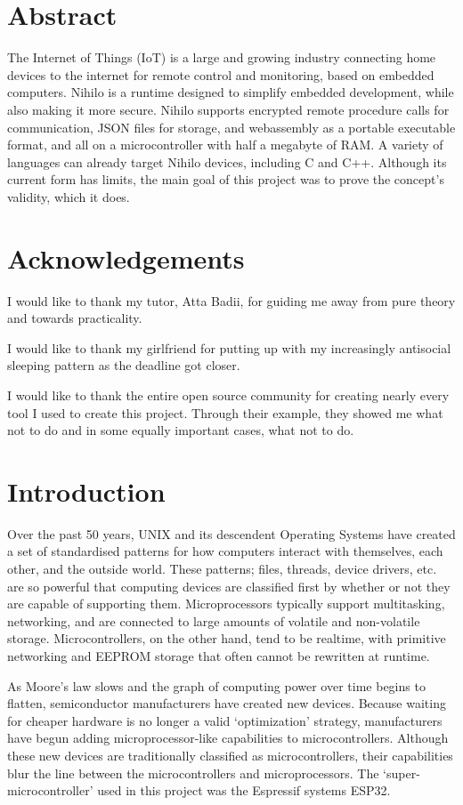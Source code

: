 \documentclass{article}
\begin{document}
\section{Abstract}
The Internet of Things (IoT) is a large and growing industry connecting home devices to the internet for remote control and monitoring, based on embedded computers. Nihilo is a runtime designed to simplify embedded development, while also making it more secure. Nihilo supports encrypted remote procedure calls for communication, JSON files for storage, and webassembly as a portable executable format, and all on a microcontroller with half a megabyte of RAM. A variety of languages can already target Nihilo devices, including C and C++. Although its current form has limits, the main goal of this project was to prove the concept's validity, which it does.

\section{Acknowledgements}
I would like to thank my tutor, Atta Badii, for guiding me away from pure theory and towards practicality.

I would like to thank my girlfriend for putting up with my increasingly antisocial sleeping pattern as the deadline got closer.

I would like to thank the entire open source community for creating nearly every tool I used to create this project. Through their example, they showed me what not to do and in some equally important cases, what not to do.

\tableofcontents
\section{Introduction}
Over the past 50 years, UNIX and its descendent Operating Systems have created a set of standardised patterns for how computers interact with themselves, each other, and the outside world.
These patterns; files, threads, device drivers, etc. are so powerful that computing devices are classified first by whether or not they are capable of supporting them.
Microprocessors typically support multitasking, networking, and are connected to large amounts of volatile and non-volatile storage.
Microcontrollers, on the other hand, tend to be realtime, with primitive networking and EEPROM storage that often cannot be rewritten at runtime.

As Moore's law slows and the graph of computing power over time begins to flatten, semiconductor manufacturers have created new devices.
Because waiting for cheaper hardware is no longer a valid \lq optimization' strategy, manufacturers have begun adding microprocessor-like capabilities to microcontrollers.
Although these new devices are traditionally classified as microcontrollers, their capabilities blur the line between the microcontrollers and microprocessors.
The \lq super-microcontroller' used in this project was the Espressif systems ESP32.
\end{document}

